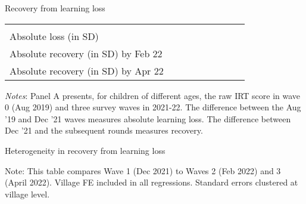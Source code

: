 \documentclass[aspectratio=169,numbering=none]{beamer}
\begin{document}
\begin{frame}{Recovery from learning loss}
\begin{table}[H]
\begin{tabular}{lcccccccc}
& & & & & & & & & \\
Absolute loss (in SD) &    &    &   &  &   &    &   &  \\
Absolute recovery (in SD) by Feb 22 &    &    &   &  &   &    &   &  \\
Absolute recovery (in SD) by Apr 22 &    &    &   &  &   &    &   &  \\
\bottomrule
\end{tabular} 
\end{table}
\footnotesize
\raggedright \textit{Notes}: Panel A presents, for children of different ages, the raw IRT score in wave 0 (Aug 2019) and three survey waves in 2021-22. The difference between the Aug '19 and Dec '21 waves measures absolute learning loss. The difference between Dec '21 and the subsequent rounds measures recovery. 
\end{frame}

\begin{frame}[plain]{Heterogeneity in recovery from learning loss}
\centering
{}

\raggedright \footnotesize{Note: This table compares Wave 1 (Dec 2021) to Waves 2 (Feb 2022) and 3 (April 2022). Village FE included in all regressions. Standard errors clustered at village level.}
\end{frame}
\end{document}
